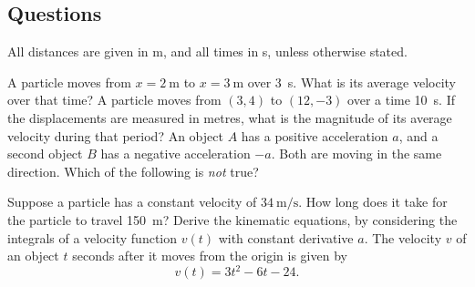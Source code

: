 \subsection*{Questions}
All distances are given in \si{\metre}, and all times in \si{\second}, unless otherwise stated.
\begin{questions}
  \questioA A particle moves from $ x = \SI{2}{\metre} $ to $ x = \SI{3}{\metre} $ over \SI{3}{\second}. What is its average velocity over that time?
  \questioA A particle moves from $ (3,4) $ to $ (12,-3) $ over a time \SI{10}{\second}. If the displacements are measured in metres, what is the magnitude of
            its average velocity during that period?
  \questioA An object $ A $ has a positive acceleration $ a $, and a second object $ B $ has a negative acceleration $ -a $. Both are moving in the
            same direction. Which of the following is \textit{not} true?
  \questioA Suppose a particle has a constant velocity of $ \SI{34}{\metre\per\second} $. How long does it take for the particle to travel \SI{150}{\metre}?
  \questioM Derive the kinematic equations, by considering the integrals of a velocity function $ v(t) $ with constant derivative $ a $.
  \questioM The velocity $ v $ of an object $ t $ seconds after it moves from the origin is given by
            \begin{displaymath}
              v(t) = 3t^2 - 6t - 24.
            \end{displaymath}
    \begin{parts}

\end{parts}
\end{questions}
